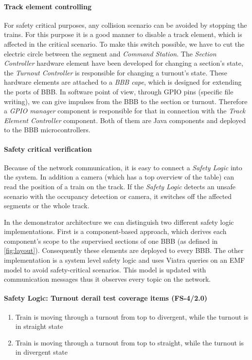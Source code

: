 \paragraph{Track element controlling}\label{par:FunctionTEC}
For safety critical purposes, any collision scenario can be avoided by stopping the trains. For this purpose it is a good manner to disable a track element, which is affected in the critical scenario. To make this switch possible, we have to cut the electric circle between the segment and \textit{Command Station}. The \textit{Section Controller} hardware element have been developed for changing a section's state,  the \textit{Turnout Controller} is responsible for changing a turnout's state. These hardware elements are attached to a \textit{BBB cape}, which is designed for extending the ports of BBB. In software point of view, through GPIO pins (specific file writing), we can give impulses from the BBB to the section or turnout. Therefore a \textit{GPIO manager} component is responsible for that in connection with the \textit{Track Element Controller} component. Both of them are Java components and deployed to the BBB microcontrollers.

\paragraph{Safety critical verification}
Because of the network communication, it is easy to connect a \textit{Safety Logic} into the system. In addition a camera (which has a top overview of the table) can read the position of a train on the track. If the \textit{Safety Logic} detects an unsafe scenario with the occupancy detection or camera, it switches off the affected segments or the whole track.

In the demonstrator architecture we can distinguish two different safety logic implementations. First is a component-based approach, which derives each component's scope to the supervised sections of one BBB (as defined in \autoref{fig:layout}). Consequently these elements are deployed to every BBB. The other implementation is a system level safety logic and uses Viatra \cite{Viatra} queries on an EMF model to avoid safety-critical scenarios. This model is updated with communication messages thus it observes every topic on the network.



\paragraph{Safety Logic: Turnout derail test coverage items (FS-4/2.0)}
\begin{enumerate}[label=FS-5/2.0-\arabic*, leftmargin=*, format=\small]
	\item Train is moving through a turnout from top to divergent, while the turnout is in straight state
	\item Train is moving through a turnout from top to straight, while the turnout is in divergent state
\end{enumerate}

